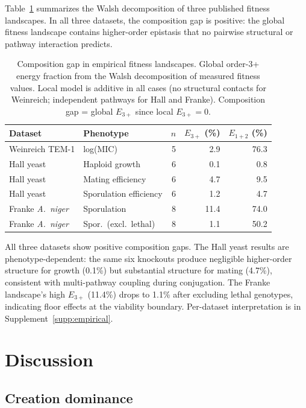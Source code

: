 \documentclass[10pt]{article}
\begin{document}
Table~\ref{tab:empirical} summarizes the Walsh decomposition of three
published fitness landscapes. In all three datasets, the composition
gap is positive: the global fitness landscape contains higher-order
epistasis that no pairwise structural or pathway interaction
predicts.

\begin{table}[t]
\centering
\caption{Composition gap in empirical fitness landscapes. Global
order-3+ energy fraction from the Walsh decomposition of measured
fitness values. Local model is additive in all cases (no structural
contacts for Weinreich; independent pathways for Hall and Franke).
Composition gap = global $E_{3+}$ since local $E_{3+} = 0$.}
\label{tab:empirical}
\begin{tabular}{llrrr}
\toprule
Dataset & Phenotype & $n$ & $E_{3+}$ (\%) & $E_{1+2}$ (\%) \\
\midrule
Weinreich TEM-1 & log(MIC) & 5 & 2.9 & 76.3 \\
Hall yeast & Haploid growth & 6 & 0.1 & 0.8 \\
Hall yeast & Mating efficiency & 6 & 4.7 & 9.5 \\
Hall yeast & Sporulation efficiency & 6 & 1.2 & 4.7 \\
Franke \emph{A.~niger} & Sporulation & 8 & 11.4 & 74.0 \\
Franke \emph{A.~niger} & Spor.\ (excl.\ lethal) & 8 & 1.1 & 50.2 \\
\bottomrule
\end{tabular}
\end{table}

All three datasets show positive composition gaps. The Hall yeast
results are phenotype-dependent: the same six knockouts produce
negligible higher-order structure for growth (0.1\%) but substantial
structure for mating (4.7\%), consistent with multi-pathway coupling
during conjugation. The Franke landscape's high $E_{3+}$ (11.4\%)
drops to 1.1\% after excluding lethal genotypes, indicating floor
effects at the viability boundary. Per-dataset interpretation is in
Supplement~\ref{supp:empirical}.


\section{Discussion}
\label{sec:discussion}

\subsection{Creation dominance}
\end{document}
